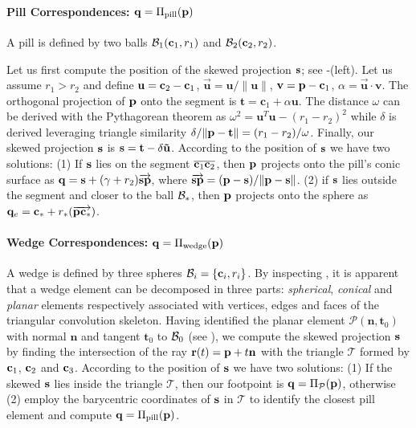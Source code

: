 
\paragraph{Pill Correspondences: $\mathbf{q}=\Pi_\text{pill}(\mathbf{p})$}
A pill is defined by two balls $\mathcal{B}_1(\mathbf{c}_1,r_1)$ and $\mathcal{B}_2(\mathbf{c}_2,r_2)$. 
\begin{DRAFT}
Let us first compute the position of the skewed projection $\mathbf{s}$; see -(left). 
% 
% 
Let us assume $r_1 > r_2$ and define $\mathbf{u} = \mathbf{c}_2-\mathbf{c}_1$, $\mathbf{\vec{u}} = \mathbf{u}/\|\mathbf{u}\|$, $\mathbf{v} = \mathbf{p}-\mathbf{c}_1$, $\alpha=\mathbf{\vec{u}} \cdot \mathbf{v}$. The orthogonal projection of $\mathbf{p}$ onto the segment is $\mathbf{t} = \mathbf{c}_1 + \alpha \mathbf{u}$. The distance $\omega$ can be derived with the Pythagorean theorem as $\omega^2 = \mathbf{u}^T \mathbf{u} - (r_1 - r_2)^2$ while $\delta$ is derived leveraging triangle similarity $\delta / \| \mathbf{p} - \mathbf{t} \| = (r_1-r_2)/\omega$. Finally, our skewed projection $\mathbf{s}$ is $\mathbf{s} = \mathbf{t} - \delta \mathbf{\vec{u}}$.
% 
According to the position of $\mathbf{s}$ we have two solutions: 
(1) If $\mathbf{s}$ lies on the segment $\overline{\mathbf{c}_1 \mathbf{c}_2}$, then $\mathbf{p}$ projects onto the pill's conic surface as $\mathbf{q}=\mathbf{s}+(\gamma+r_2) \overrightarrow{\mathbf{\mathbf{s}} \mathbf{p}}$, where $\overrightarrow{\mathbf{s} \mathbf{p}} = (\mathbf{p}-\mathbf{s})/ \|\mathbf{p}-\mathbf{s}\|$. 
(2) if $\mathbf{s}$ lies outside the segment and closer to the ball $\mathcal{B}_*$, then $\mathbf{p}$ projects onto the sphere as $\mathbf{q}_e = \mathbf{c}_* + r_*(\overrightarrow{\mathbf{p} \mathbf{c}_*})$.
\end{DRAFT}

\paragraph{Wedge Correspondences: $\mathbf{q}=\Pi_\text{wedge}(\mathbf{p})$}
A wedge is defined by three spheres $\mathcal{B}_i = \{\mathbf{c}_i, r_i\}$. By inspecting , it is apparent that a wedge element can be decomposed in three parts: \emph{spherical}, \emph{conical} and \emph{planar} elements respectively associated with vertices, edges and faces of the triangular convolution skeleton. Having identified the planar element $\mathcal{P}(\mathbf{n}, \mathbf{t}_0)$ with normal $\mathbf{n}$ and tangent $\mathbf{t}_0$ to $\mathcal{B}_0$ (see ), we compute the skewed projection $\mathbf{s}$ by finding the intersection of the ray $\mathbf{r}(t) = \mathbf{p} + t\mathbf{n}$ with the triangle $\mathcal{T}$ formed by $\mathbf{c}_1$, $\mathbf{c}_2$ and $\mathbf{c}_3$. 
% 
According to the position of $\mathbf{s}$ we have two solutions:
(1) If the skewed $\mathbf{s}$ lies inside the triangle $\mathcal{T}$, then our footpoint is $\mathbf{q} = \Pi_\mathcal{P}(\mathbf{p})$, otherwise 
(2) employ the barycentric coordinates of $\mathbf{s}$ in $\mathcal{T}$ to identify the closest pill element and compute $\mathbf{q}=\Pi_\text{pill}(\mathbf{p})$.

